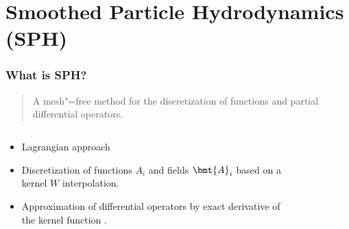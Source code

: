 \section{Smoothed Particle Hydrodynamics (SPH)}

\begin{frame}
    \frametitle{What is SPH?}

    \begin{quote}
       \glqq{}A mesh"=free method for the discretization of functions and partial differential operators.\grqq{} \cite{SPH_Tutorial_2019}
    \end{quote}

    \begin{columns}[T] %
        \begin{column}{.4\textwidth}

            \vspace*{0.2cm}
            \begin{itemize}
                \item Lagrangian approach
            \end{itemize}

            \vspace*{1.6cm}

            \begin{itemize}
                \item Discretization of functions $A_i$ and fields $\bmt{A}_i$ based on a kernel $W$ interpolation.
            \end{itemize}
            \vspace*{1.2cm}

            \begin{itemize}
                \item Approximation of differential operators by exact derivative of the kernel function \cite{Price2012}.
            \end{itemize}
        \end{column}
        \hfill
        \begin{column}{.6\textwidth}
            \begin{figure}[h]
                \centering
                \def\svgwidth{0.25\textwidth}
                
                \label{fig: lagragian}
            \end{figure}
            \vspace*{0.3cm}


\end{column}
\end{columns}
\end{frame}
